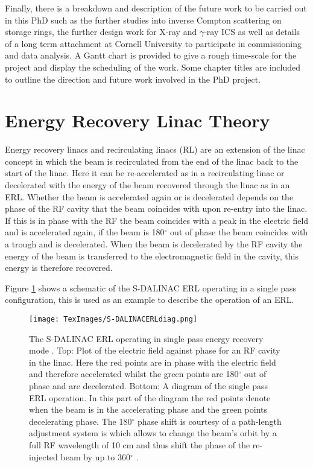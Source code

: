 \documentclass[11pt]{article}
\begin{document}
Finally, there is a breakdown and description of the future work to be carried out in this PhD such as the further studies into inverse Compton scattering on storage rings, the further design work for X-ray and $\gamma$-ray ICS as well as details of a long term attachment at Cornell University to participate in commissioning and data analysis. A Gantt chart is provided to give a rough time-scale for the project and display the scheduling of the work. Some chapter titles are included to outline the direction and future work involved in the PhD project.
  
\section{Energy Recovery Linac Theory}
\label{sec:ERLtheory}

Energy recovery linacs and recirculating linacs (RL) are an extension of the linac concept in which the beam is recirculated from the end of the linac back to the start of the linac. Here it can be re-accelerated as in a recirculating linac or decelerated with the energy of the beam recovered through the linac as in an ERL. Whether the beam is accelerated again or is decelerated depends on the phase of the RF cavity that the beam coincides with upon re-entry into the linac. If this is in phase with the RF the beam coincides with a peak in the electric field and is accelerated again, if the beam is 180$^{\circ}$ out of phase the beam coincides with a trough and is decelerated. When the beam is decelerated by the RF cavity the energy of the beam is transferred to the electromagnetic field in the cavity, this energy is therefore recovered.

Figure \ref{fig:SDALINACERLtheory} shows a schematic of the S-DALINAC ERL operating in a single pass configuration, this is used as an example to describe the operation of an ERL.

\begin{figure}[H]
\centering
\texttt{[image: TexImages/S-DALINACERLdiag.png]}
\caption{\label{fig:SDALINACERLtheory} The S-DALINAC ERL operating in single pass energy recovery mode \cite{SDALINACipac9}. Top: Plot of the electric field against phase for an RF cavity in the linac. Here the red points are in phase with the electric field and therefore accelerated whilst the green points are 180$^{\circ}$ out of phase and are decelerated.  Bottom: A diagram of the single pass ERL operation. In this part of the diagram the red points denote when the beam is in the accelerating phase and the green points decelerating phase. The 180$^{\circ}$ phase shift is courtesy of a path-length adjustment system is which allows to change the beam’s orbit by a full RF wavelength of 10 cm and thus shift the phase of the
re-injected beam by up to 360$^{\circ}$ \cite{SDALINACipac9}.}
\end{figure}
\end{document}
